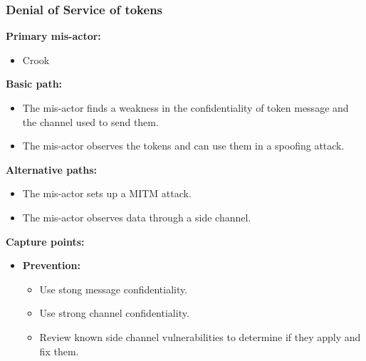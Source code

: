 \documentclass[a4paper,11pt]{report}
\begin{document}
\subsubsection{Denial of Service of tokens}
\textbf{Primary mis-actor:}
\begin{itemize}
\item Crook
\end{itemize}
\textbf{Basic path:}
\begin{itemize}
\item The mis-actor finds a weakness in the confidentiality of token message and the channel used to send them.
\item The mis-actor observes the tokens and can use them in a spoofing attack.
\end{itemize}
\textbf{Alternative paths:}
\begin{itemize}
\item The mis-actor sets up a MITM attack.
\item The mis-actor observes data through a side channel.
\end{itemize}
\textbf{Capture points:}
\begin{itemize}
\item \textbf{Prevention:}
\begin{itemize}
\item Use stong message confidentiality.
\item Use strong channel confidentiality.
\item Review known side channel vulnerabilities to determine if they apply and fix them.
\end{itemize}
\end{itemize}
\end{document}
